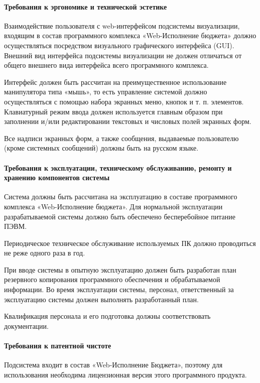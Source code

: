 \documentclass[a4paper]{extarticle}
\begin{document}
\paragraph{Требования к эргономике и технической эстетике}
Взаимодействие пользователя с web-интерфейсом подсистемы визуализации, входящим в состав программного комплекса «Web-Исполнение бюджета» должно осуществляться посредством визуального графического интерфейса (GUI). Внешний вид интерфейса подсистемы визуализации не должен отличаться от общего внешнего вида интерфейса всего программного комплекса.\par
Интерфейс должен быть рассчитан на преимущественное использование манипулятора типа «мышь», то есть управление системой должно осуществляться с помощью набора экранных меню, кнопок и т. п. элементов. Клавиатурный режим ввода должен используется главным образом при заполнении и/или редактировании текстовых и числовых полей экранных форм.\par
Все надписи экранных форм, а также сообщения, выдаваемые пользователю (кроме системных сообщений) должны быть на русском языке.

\paragraph{Требования к эксплуатации, техническому обслуживанию, ремонту и хранению компонентов системы}
Система должны быть рассчитана на эксплуатацию в составе программного комплекса «Web-Исполнение бюджета». Для нормальной эксплуатации разрабатываемой системы должно быть обеспечено бесперебойное питание ПЭВМ.\par
Периодическое техническое обслуживание используемых ПК должно проводиться не реже одного раза в год.\par
При вводе системы в опытную эксплуатацию должен быть разработан план резервного копирования программного обеспечения и обрабатываемой информации. Во время эксплуатации системы, персонал, ответственный за эксплуатацию системы должен выполнять разработанный план.\par
Квалификация персонала и его подготовка должны соответствовать документации.

\paragraph{Требования к патентной чистоте}
Подсистема входит в состав «Web-Исполнение Бюджета», поэтому для использования необходима лицензионная версия этого программного продукта.
\end{document}
